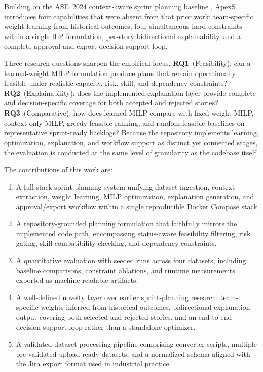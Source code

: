 \documentclass[conference]{IEEEtran}
\begin{document}
Building on the ASE~2024 context-aware sprint planning baseline \cite{ase2024},
ApexS introduces four capabilities that were absent from that prior work:
team-specific weight learning from historical outcomes, four simultaneous hard
constraints within a single ILP formulation, per-story bidirectional explainability,
and a complete approval-and-export decision support loop.

Three research questions sharpen the empirical focus.
\textbf{RQ1}~(Feasibility): can a learned-weight MILP formulation produce plans
that remain operationally feasible under realistic capacity, risk, skill, and
dependency constraints?
\textbf{RQ2}~(Explainability): does the implemented explanation layer provide
complete and decision-specific coverage for both accepted and rejected stories?
\textbf{RQ3}~(Comparative): how does learned MILP compare with fixed-weight MILP,
context-only MILP, greedy feasible ranking, and random feasible baselines on
representative sprint-ready backlogs?
Because the repository implements learning, optimization, explanation, and workflow
support as distinct yet connected stages, the evaluation is conducted at the same
level of granularity as the codebase itself.

The contributions of this work are:
\begin{enumerate}[leftmargin=*,itemsep=1pt,topsep=2pt]
	\item A full-stack sprint planning system unifying dataset ingestion, context
	      extraction, weight learning, MILP optimization, explanation generation, and
	      approval/export workflow within a single reproducible Docker Compose stack.
	\item A repository-grounded planning formulation that faithfully mirrors the
	      implemented code path, encompassing status-aware feasibility filtering, risk
	      gating, skill compatibility checking, and dependency constraints.
	\item A quantitative evaluation with seeded runs across four datasets, including
	      baseline comparisons, constraint ablations, and runtime measurements exported
	      as machine-readable artifacts.
	\item A well-defined novelty layer over earlier sprint-planning research: team-specific
	      weights inferred from historical outcomes, bidirectional explanation output
	      covering both selected and rejected stories, and an end-to-end decision-support
	      loop rather than a standalone optimizer.
	\item A validated dataset processing pipeline comprising converter scripts, multiple
	      pre-validated upload-ready datasets, and a normalized schema aligned with the
	      Jira export format used in industrial practice.
\end{enumerate}
\end{document}
